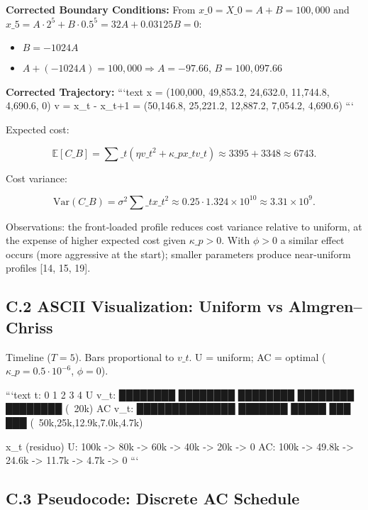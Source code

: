 \documentclass[11pt,a4paper]{article}
\begin{document}
\textbf{Corrected Boundary Conditions:}
From $x\_0 = X\_0 = A + B = 100,000$ and $x\_5 = A \cdot 2^5 + B \cdot 0.5^5 = 32A + 0.03125B = 0$:
\begin{itemize}
\item $B = -1024A$ 
\item $A + (-1024A) = 100,000 \Rightarrow A = -97.66$, $B = 100,097.66$

\end{itemize}
\textbf{Corrected Trajectory:}
```text
x = (100,000, 49,853.2, 24,632.0, 11,744.8, 4,690.6, 0)
v = x\_t - x\_{t+1} = (50,146.8, 25,221.2, 12,887.2, 7,054.2, 4,690.6)
```

Expected cost:

\begin{equation}
\mathbb{E}[C\_B] = \sum\_t (\eta v\_t^2 + \kappa\_p x\_t v\_t) \approx 3395 + 3348 \approx 6743.
\end{equation}

Cost variance:

\begin{equation}
\mathrm{Var}(C\_B) = \sigma^2\sum\_t x\_t^2 \approx 0.25\cdot 1.324\times 10^{10} \approx 3.31\times 10^9.
\end{equation}

Observations: the front‑loaded profile reduces cost variance relative to uniform, at the expense of higher expected cost given $\kappa\_p>0$. With $\phi>0$ a similar effect occurs (more aggressive at the start); smaller parameters produce near‑uniform profiles [14, 15, 19].

\subsection{C.2 ASCII Visualization: Uniform vs Almgren–Chriss}

Timeline ($T=5$). Bars proportional to $v\_t$. U = uniform; AC = optimal ($\kappa\_p=0.5\cdot 10^{-6}$, $\phi=0$).

```text
t:      0        1        2        3        4
U v\_t:  ████████ ████████ ████████ ████████ ████████  (~20k)
AC v\_t: ██████████████ ███████ █████ ███ ███          (~50k,25k,12.9k,7.0k,4.7k)

x\_t (residuo)
U:      100k -> 80k -> 60k -> 40k -> 20k -> 0
AC:     100k -> 49.8k -> 24.6k -> 11.7k -> 4.7k -> 0
```

\subsection{C.3 Pseudocode: Discrete AC Schedule}
\end{document}

